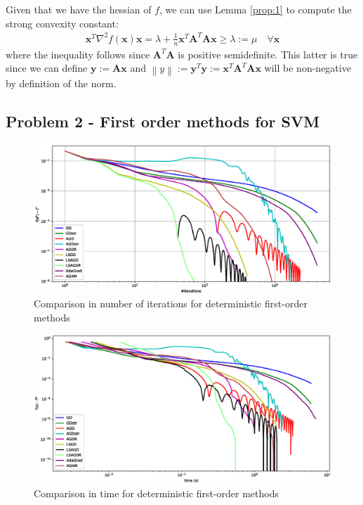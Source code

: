 \documentclass[letterpaper]{article}
\providecommand{\xx}{\mathbf{x}}
\providecommand{\yy}{\mathbf{y}}
\providecommand{\1}{\mathbf{1}}
\providecommand{\0}{\mathbf{0}}
\providecommand{\mA}{\mathbf{A}}
\providecommand{\norm}[1]{\ensuremath{\left\lVert#1\right\rVert}}
\begin{document}
\begin{enumerate}[label=(\alph*)]
    Given that we have the hessian of $f$, we can use Lemma \ref{prop:1} to compute the strong convexity constant:
    \begin{align}
        \xx^T \nabla^2 f(\xx) \xx  = \lambda + \frac{1}{n}\xx^T\mA^T \mA \xx \geq \lambda := \mu \quad \forall \xx
    \end{align}
    where the inequality follows since $\mA^T \mA$ is positive semidefinite. This latter is true since we can define $\yy:=\mA \xx$ and $\norm{y} := \yy^T \yy := \xx^T\mA^T \mA \xx $ will be non-negative by definition of the norm.
\end{enumerate}

\subsection*{Problem 2 - First order methods for SVM}
\begin{figure}[ht]
    \centering
    \includegraphics[scale=0.4]{2_iterations}
    \caption{Comparison in number of iterations for deterministic first-order methods}
    \label{fig:2_iterations}
\end{figure}
\begin{figure}[ht]
    \centering
    \includegraphics[scale=0.4]{2_time}
    \caption{Comparison in time for deterministic first-order methods}
    \label{fig:2_time}
\end{figure}
\end{document}
